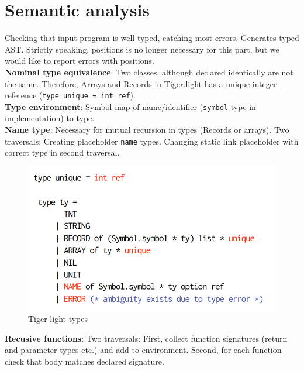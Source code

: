 \section{Semantic analysis}

Checking that input program is well-typed, catching most errors. Generates typed AST. Strictly speaking, positions is no longer necessary for this part, but we would like to report errors with positions.\\

\textbf{Nominal type equivalence}: Two classes, although declared identically are not the same. Therefore, Arrays and Records in Tiger.light has a unique integer reference (\texttt{type unique = int ref}).\\

\textbf{Type environment}: Symbol map of name/identifier (\texttt{symbol} type in implementation) to type.\\

\textbf{Name type}: Necessary for mutual recursion in types (Records or arrays). Two traversals: Creating placeholder \texttt{name} types. Changing static link placeholder with correct type in second traversal.

\begin{figure}[h]
    \centering
    \includegraphics[scale=0.5]{assets/tigerlight_types.PNG}
    \caption{Tiger light types}
    \label{tiger_types}
\end{figure}

\textbf{Recusive functions}: Two traversals: First, collect function signatures (return and parameter types etc.) and add to environment. Second, for each function check that body matches declared signature.

